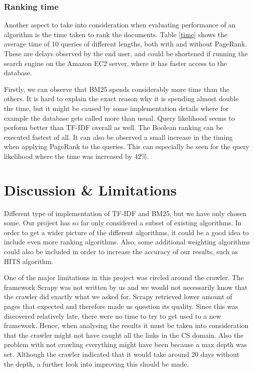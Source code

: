 \subsubsection{Ranking time}

Another aspect to take into consideration when evaluating performance of an algorithm is the time taken to rank the documents. Table \ref{time} shows the average time of 10 queries of different lengths, both with and without PageRank. These are delays observed by the end user, and could be shortened if running the search engine on the Amazon EC2 server, where it has faster access to the database.

Firstly, we can observe that BM25 spends considerably more time than the others. It is hard to explain the exact reason why it is spending almost double the time, but it might be caused by some implementation details where for example the database gets called more than usual. Query likelihood seems to perform better than TF-IDF overall as well. The Boolean ranking can be executed fastest of all. It can also be observed a small increase in the timing when applying PageRank to the queries. This can especially be seen for the query likelihood where the time was increased by 42\%.



\section{Discussion \& Limitations} %
\label{sec:discussion_&_limitations}

Different type of implementation of TF-IDF and BM25, but we have only chosen some. 
Our project has so far only considered a subset of existing algorithms. In order to get a wider picture of the different algorithms, it could be a good idea to include even more ranking algorithms. Also, some additional weighting algorithms could also be included in order to increase the accuracy of our results, such as HITS algorithm.

One of the major limitations in this project was circled around the crawler. The framework Scrapy was not written by us and we would not necessarily know that the crawler did exactly what we asked for. Scrapy retrieved lower amount of pages that expected and therefore made us question its quality. Since this was discovered relatively late, there were no time to try to get used to a new framework. Hence, when analysing the results it must be taken into consideration that the crawler might not have caught all the links in the CS domain. Also the problem with not crawling everything might have been because a max depth was set. Although the crawler indicated that it would take around 20 days without the depth, a further look into improving this should be made.

